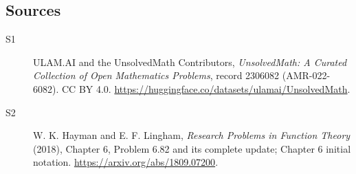 \documentclass[11pt]{article}
\begin{document}
\subsection{Sources}
\begin{description}
\item[\hypertarget{source:2306082:1}{S1}] ULAM.AI and the UnsolvedMath Contributors, \emph{UnsolvedMath: A Curated Collection of Open Mathematics Problems}, record 2306082 (AMR-022-6082). CC BY 4.0. \url{https://huggingface.co/datasets/ulamai/UnsolvedMath}.
\item[\hypertarget{source:2306082:2}{S2}] W. K. Hayman and E. F. Lingham, \emph{Research Problems in Function Theory} (2018), Chapter 6, Problem 6.82 and its complete update; Chapter 6 initial notation. \url{https://arxiv.org/abs/1809.07200}.
\end{description}
\label{end:2306082}
\end{document}
